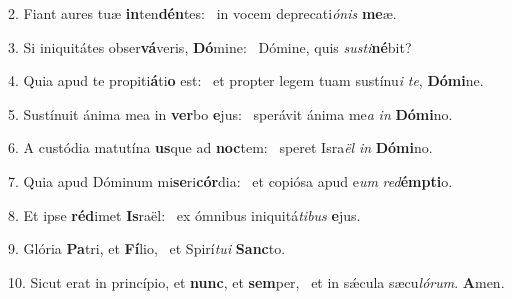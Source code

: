 2. Fiant aures tuæ \textbf{in}ten\textbf{dén}tes: \ast\  in vocem deprecati\textit{ó}\textit{nis} \textbf{me}æ.\

3. Si iniquitátes obser\textbf{vá}veris, \textbf{Dó}mine: \ast\  Dómine, quis \textit{sus}\textit{ti}\textbf{né}bit?\

4. Quia apud te propiti\textbf{á}ti\textbf{o} est: \ast\  et propter legem tuam sustínu\textit{i} \textit{te}, \textbf{Dó}\textbf{mi}ne.\

5. Sustínuit ánima mea in \textbf{ver}bo \textbf{e}jus: \ast\  sperávit ánima me\textit{a} \textit{in} \textbf{Dó}\textbf{mi}no.\

6. A custódia matutína \textbf{us}que ad \textbf{noc}tem: \ast\  speret Isra\textit{ël} \textit{in} \textbf{Dó}\textbf{mi}no.\

7. Quia apud Dóminum mi\textbf{se}ri\textbf{cór}dia: \ast\  et copiósa apud e\textit{um} \textit{red}\textbf{émp}\textbf{ti}o.\

8. Et ipse \textbf{réd}imet \textbf{Is}raël: \ast\  ex ómnibus iniquitá\textit{ti}\textit{bus} \textbf{e}jus.\

9. Glória \textbf{Pa}tri, et \textbf{Fí}lio, \ast\  et Spirí\textit{tu}\textit{i} \textbf{Sanc}to.\

10. Sicut erat in princípio, et \textbf{nunc}, et \textbf{sem}per, \ast\  et in sǽcula sæcu\textit{ló}\textit{rum}. \textbf{A}men.\

